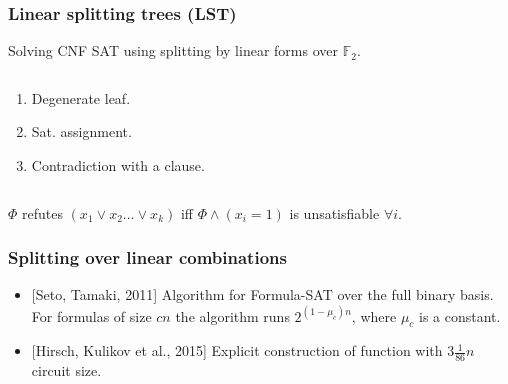 \begin{frame}
    \frametitle{Linear splitting trees (LST)}
    
	Solving CNF SAT using splitting by linear forms over $\mathbb{F}_2$.

    \begin{columns}[T]
        \begin{column}{4cm}
            \begin{enumerate}
                \item<1-> Degenerate leaf.
                \item<2-> Sat. assignment.
            	\item<3-> Contradiction with a clause.
            \end{enumerate}
        \end{column}
        \begin{column}{4cm}
            \begin{minipage}[c][.6\textheight][c]{\linewidth}
        	\end{minipage}
        \end{column}
    \end{columns}
    
	$\Phi$ refutes $(x_1 \lor x_2 \dots \lor x_k)$ iff $\Phi \land (x_i = 1)$ is
    unsatisfiable $\forall i$.
\end{frame}



\begin{frame}
    \frametitle{Splitting over linear combinations}

	\begin{itemize}
		\item{} [Seto, Tamaki, 2011] Algorithm for Formula-SAT over the full binary
		    basis. For formulas of size $cn$ the algorithm runs $2^{(1 - \mu_c)n}$,
            where $\mu_c$ is a constant.
        \pause
		\item{} [Hirsch, Kulikov et al., 2015] Explicit construction of function with $3 \frac{1}{86}n$ circuit size.
	\end{itemize}    
\end{frame}